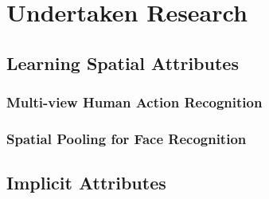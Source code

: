 \chapter{Undertaken Research}


\section{Learning Spatial Attributes}

\subsection{Multi-view Human Action Recognition}

\subsection{Spatial Pooling for Face Recognition}

\section{Implicit Attributes}


